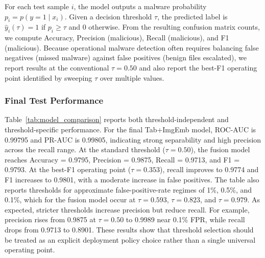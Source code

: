 \documentclass[conference]{IEEEtran}
\begin{document}
For each test sample $i$, the model outputs a malware probability $p_i = p(y=1 \mid x_i)$.
Given a decision threshold $\tau$, the predicted label is $\widehat{y}_i(\tau)=1$ if $p_i \geq \tau$ and 0 otherwise.
From the resulting confusion matrix counts, we compute Accuracy, Precision (malicious), Recall (malicious), and F1 (malicious).
Because operational malware detection often requires balancing false negatives (missed malware) against false positives (benign files escalated), we report results at the conventional $\tau=0.50$ and also report the best-F1 operating point identified by sweeping $\tau$ over multiple values.

\subsubsection{Final Test Performance}

Table~\ref{tab:model_comparison} reports both threshold-independent and threshold-specific performance.
For the final Tab+ImgEmb model, ROC-AUC is 0.99795 and PR-AUC is 0.99805, indicating strong separability and high precision across the recall range.
At the standard threshold ($\tau=0.50$), the fusion model reaches Accuracy = 0.9795, Precision = 0.9875, Recall = 0.9713, and F1 = 0.9793.
At the best-F1 operating point ($\tau=0.353$), recall improves to 0.9774 and F1 increases to 0.9801, with a moderate increase in false positives.
The table also reports thresholds for approximate false-positive-rate regimes of 1\%, 0.5\%, and 0.1\%, which for the fusion model occur at $\tau=0.593$, $\tau=0.823$, and $\tau=0.979$.
As expected, stricter thresholds increase precision but reduce recall.
For example, precision rises from 0.9875 at $\tau=0.50$ to 0.9989 near 0.1\% FPR, while recall drops from 0.9713 to 0.8901.
These results show that threshold selection should be treated as an explicit deployment policy choice rather than a single universal operating point.
\end{document}
